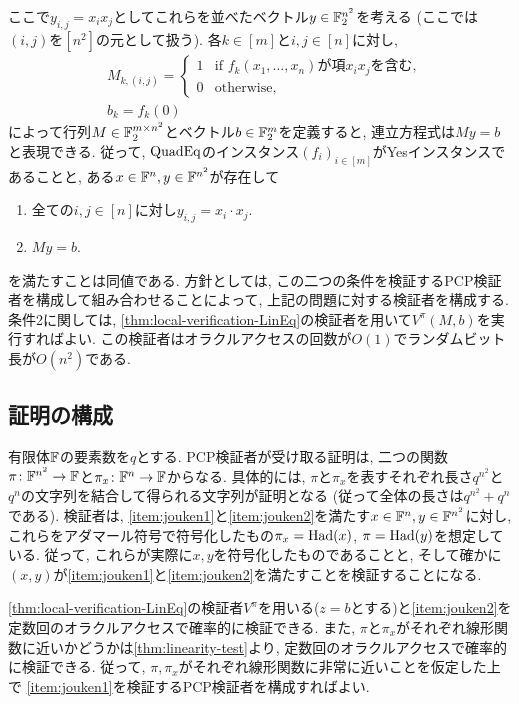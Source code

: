   ここで$y_{i,j}=x_ix_j$としてこれらを並べたベクトル$y\in\mathbb{F}_2^{n^2}$を考える (ここでは$(i,j)$を$[n^2]$の元として扱う).
  各$k\in[m]$と$i,j\in[n]$に対し,
  \begin{align}
    &M_{k,(i,j)} = \begin{cases}
      1 & \text{if $f_k(x_1,\dots,x_n)$が項$x_i x_j$を含む},\\
      0 & \text{otherwise},
    \end{cases} \label{eq:M-matrix}\\
    &b_k = f_k(0) \label{eq:b-vector}
  \end{align}
  によって行列$M\in\mathbb{F}_2^{m\times n^2}$とベクトル$b\in\mathbb{F}_2^m$を定義すると, 連立方程式は$My=b$と表現できる.
  従って,
  $\text{QuadEq}$のインスタンス$(f_i)_{i\in[m]}$がYesインスタンスであることと, ある$x\in\mathbb{F}^n,y\in\mathbb{F}^{n^2}$が存在して
  \begin{enumerate}[label=\textbf{条件\arabic*}, leftmargin=1.5cm]
    \item 全ての$i,j\in [n]$に対し$y_{i,j}=x_i\cdot x_j$. \label{item:jouken1}
    \item $My=b$. \label{item:jouken2}
  \end{enumerate}  
  を満たすことは同値である.
  方針としては, この二つの条件を検証するPCP検証者を構成して組み合わせることによって, 上記の問題に対する検証者を構成する.
  条件2に関しては, \cref{thm:local-verification-LinEq}の検証者を用いて$V^\pi(M,b)$を実行すればよい.
  この検証者はオラクルアクセスの回数が$O(1)$でランダムビット長が$O(n^2)$である.

  \subsection{証明の構成}
  有限体$\mathbb{F}$の要素数を$q$とする.
  PCP検証者が受け取る証明は, 二つの関数$\pi\colon\mathbb{F}^{n^2}\to\mathbb{F}$と$\pi_x\colon\mathbb{F}^n\to\mathbb{F}$からなる.
  具体的には, $\pi$と$\pi_x$を表すそれぞれ長さ$q^{n^2}$と$q^n$の文字列を結合して得られる文字列が証明となる (従って全体の長さは$q^{n^2}+q^n$である).
  検証者は, \ref{item:jouken1}と\ref{item:jouken2}を満たす$x\in\mathbb{F}^n,y\in\mathbb{F}^{n^2}$に対し, これらをアダマール符号で符号化したもの$\pi_x=\mathrm{Had}(x)$, $\pi = \mathrm{Had}(y)$を想定している.
  従って, これらが実際に$x,y$を符号化したものであることと, そして確かに$(x,y)$が\ref{item:jouken1}と\ref{item:jouken2}を満たすことを検証することになる.
  
  \cref{thm:local-verification-LinEq}の検証者$V^\pi$を用いる($z=b$とする)と\ref{item:jouken2}を定数回のオラクルアクセスで確率的に検証できる.
  また, $\pi$と$\pi_x$がそれぞれ線形関数に近いかどうかは\cref{thm:linearity-test}より, 定数回のオラクルアクセスで確率的に検証できる.
  従って, $\pi,\pi_x$がそれぞれ線形関数に非常に近いことを仮定した上で
  \ref{item:jouken1}を検証するPCP検証者を構成すればよい.

